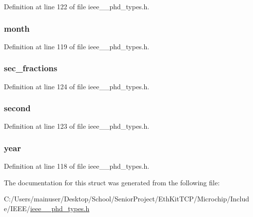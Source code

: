 Definition at line 122 of file ieee\+\_\+\_\+phd\+\_\+types.\+h.

\hypertarget{struct___absolute_time_ae1364dc4dd11693c36213602e562ad0a}{}
\subsubsection[{month}]{ month}\label{struct___absolute_time_ae1364dc4dd11693c36213602e562ad0a}


Definition at line 119 of file ieee\+\_\+\_\+phd\+\_\+types.\+h.

\hypertarget{struct___absolute_time_a97354dc68233fac75d21f09e781612bd}{}
\subsubsection[{sec\+\_\+fractions}]{ sec\+\_\+fractions}\label{struct___absolute_time_a97354dc68233fac75d21f09e781612bd}


Definition at line 124 of file ieee\+\_\+\_\+phd\+\_\+types.\+h.

\hypertarget{struct___absolute_time_a31aae03e13deba287b27a6e34e1066de}{}
\subsubsection[{second}]{ second}\label{struct___absolute_time_a31aae03e13deba287b27a6e34e1066de}


Definition at line 123 of file ieee\+\_\+\_\+phd\+\_\+types.\+h.

\hypertarget{struct___absolute_time_a7b57e47ace93ac7c9f1dd119351c5753}{}
\subsubsection[{year}]{ year}\label{struct___absolute_time_a7b57e47ace93ac7c9f1dd119351c5753}


Definition at line 118 of file ieee\+\_\+\_\+phd\+\_\+types.\+h.



The documentation for this struct was generated from the following file\+:\begin{DoxyCompactItemize}
\item 
C\+:/\+Users/mainuser/\+Desktop/\+School/\+Senior\+Project/\+Eth\+Kit\+T\+C\+P/\+Microchip/\+Include/\+I\+E\+E\+E/\hyperlink{ieee__11073__phd__types_8h}{ieee\+\_\+\_\+phd\+\_\+types.\+h}\end{DoxyCompactItemize}
